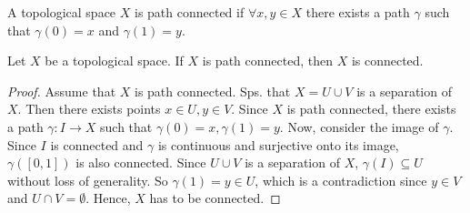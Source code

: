 \begin{definition}
   A topological space \( X \) is path connected
   if \( \forall x, y \in X \) there exists a path
   \( \gamma \) such that \( \gamma(0) = x \) and \( \gamma(1) = y \).
\end{definition}

\begin{proposition}
    Let \( X \) be a topological space.
    If \( X \) is path connected, then \( X \) is connected.
\end{proposition}

\begin{proof}
   Assume that \( X \) is path connected.
   Sps. that \( X = U  \cup V \) is a separation
   of \( X \).
   Then there exists points \( x \in U, y \in V \).
   Since \( X \) is path connected, there exists
   a path \( \gamma: I \to X \) such that
   \( \gamma(0) = x, \gamma(1) = y \).
   Now, consider the image of \( \gamma \).
   Since \( I \) is connected
   and \( \gamma  \) is continuous and surjective
   onto its image, \( \gamma ([0, 1]) \) is also
   connected.
   Since \( U \cup V\) is a separation of \( X \),
  \( \gamma(I) \subseteq U \) without
   loss of generality.
    So \( \gamma(1) = y \in U \), which is a contradiction
    since \( y \in V \) and \( U \cap V = \emptyset \).
    Hence, \( X \) has to be connected.
\end{proof}


